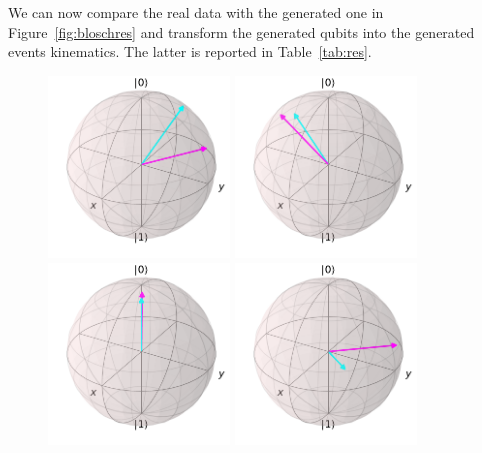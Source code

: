 We can now compare the real data with the generated one in Figure~\ref{fig:bloschres} 
and transform the generated qubits into the generated events kinematics. The 
latter is reported in Table~\ref{tab:res}.

\begin{figure}[!htbp]
\centering
    \includegraphics[width=0.43\textwidth]{../results_7C/1360_Q1.pdf}
    \includegraphics[width=0.43\textwidth]{../results_7C/1360_Q2.pdf} \\
    \includegraphics[width=0.43\textwidth]{../results_7C/1785_Q1.pdf}
    \includegraphics[width=0.43\textwidth]{../results_7C/1785_Q2.pdf} \\

\end{figure}
